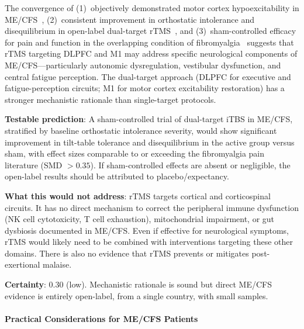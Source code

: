 \begin{speculation}
\label{spec:tms-mecfs}
The convergence of (1)~objectively demonstrated motor cortex hypoexcitability in ME/CFS~\cite{Samii1996TMS,Starr2000TMS,Davey2003TMS}, (2)~consistent improvement in orthostatic intolerance and disequilibrium in open-label dual-target rTMS~\cite{Miwa2023rTMS,Miwa2025rTMS}, and (3)~sham-controlled efficacy for pain and function in the overlapping condition of fibromyalgia~\cite{Toh2022fibrorTMS,Su2021fibrorTMS} suggests that rTMS targeting DLPFC and M1 may address specific neurological components of ME/CFS---particularly autonomic dysregulation, vestibular dysfunction, and central fatigue perception. The dual-target approach (DLPFC for executive and fatigue-perception circuits; M1 for motor cortex excitability restoration) has a stronger mechanistic rationale than single-target protocols.

\textbf{Testable prediction}: A sham-controlled trial of dual-target iTBS in ME/CFS, stratified by baseline orthostatic intolerance severity, would show significant improvement in tilt-table tolerance and disequilibrium in the active group versus sham, with effect sizes comparable to or exceeding the fibromyalgia pain literature (SMD $> 0.35$). If sham-controlled effects are absent or negligible, the open-label results should be attributed to placebo/expectancy.

\textbf{What this would not address}: rTMS targets cortical and corticospinal circuits. It has no direct mechanism to correct the peripheral immune dysfunction (NK cell cytotoxicity, T cell exhaustion), mitochondrial impairment, or gut dysbiosis documented in ME/CFS. Even if effective for neurological symptoms, rTMS would likely need to be combined with interventions targeting these other domains. There is also no evidence that rTMS prevents or mitigates post-exertional malaise.

\textbf{Certainty}: 0.30 (low). Mechanistic rationale is sound but direct ME/CFS evidence is entirely open-label, from a single country, with small samples.
\end{speculation}

\paragraph{Practical Considerations for ME/CFS Patients}

